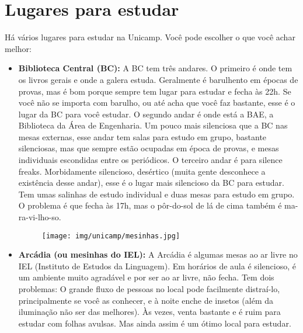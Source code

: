 
\section{Lugares para estudar}

Há vários lugares para estudar na Unicamp. Você pode escolher o que você achar
melhor:

\begin{itemize}
    \item  \textbf{Biblioteca Central (BC):} A BC tem três andares. O primeiro é
        onde tem os livros gerais e onde a galera estuda. Geralmente é
        barulhento em épocas de provas, mas é bom porque sempre tem lugar para
        estudar e fecha às 22h.  Se você não se importa com barulho, ou até acha
        que você faz bastante, esse é o lugar da BC para você estudar. O segundo
        andar é onde está a BAE, a Biblioteca da Área de Engenharia. Um pouco
        mais silenciosa que a BC nas mesas externas, esse andar tem salas para
        estudo em grupo, bastante silenciosas, mas que sempre estão ocupadas em
        época de provas, e mesas individuais escondidas entre os periódicos. O
        terceiro andar é para silence freaks. Morbidamente silencioso, desértico
        (muita gente desconhece a existência desse andar), esse é o lugar mais
        silencioso da BC para estudar. Tem umas salinhas de estudo individual e
        duas mesas para estudo em grupo. O problema é que fecha às 17h, mas o
        pôr-do-sol de lá de cima também é ma-ra-vi-lho-so.

        \begin{figure}[h!]
            \centering
            \texttt{[image: img/unicamp/mesinhas.jpg]}
        \end{figure}

    \item  \textbf{Arcádia (ou mesinhas do IEL):} A Arcádia é algumas mesas ao
        ar livre no IEL (Instituto de Estudos da Linguagem). Em horários de aula
        é silencioso, é um ambiente muito agradável e por ser ao ar livre, não
        fecha.  Tem dois problemas: O grande fluxo de pessoas no local pode
        facilmente distraí-lo, principalmente se você as conhecer, e à noite
        enche de insetos (além da iluminação não ser das melhores). Às vezes,
        venta bastante e é ruim para estudar com folhas avulsas. Mas ainda assim
        é um ótimo local para estudar.


\end{itemize}
